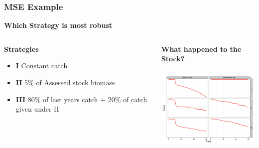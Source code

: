 \begin{frame}\frametitle{MSE Example}
\smallskip\textbf{Which Strategy is most robust}\smallskip\\
\begin{columns}[t] 
\begin{column}[T]{4cm} %
     \smallskip\textbf{Strategies}\smallskip\\
       \Fontviii
       \begin{itemize}
          \item \textbf{I} Constant catch
          \item \textbf{II} 5\% of Assessed stock biomass
          \item \textbf{III} 80\% of last years catch + 20\% of catch given under II
        \end{itemize}
     \end{column}
\begin{column}[T]{6cm}
 \smallskip\textbf{What happened to the Stock?}\smallskip\\ 
  \includegraphics[height=48mm,width=64mm]{mp1.png}
\end{column}
\end{columns}    
\end{frame}


